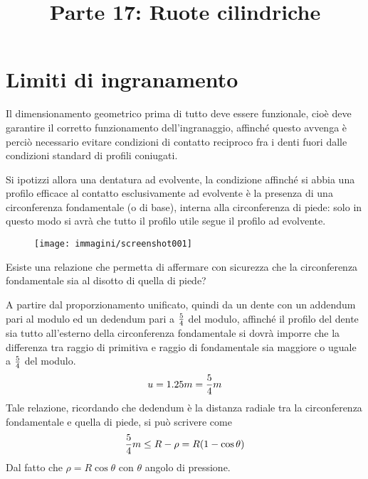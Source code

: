 \documentclass[a4paper, 15pt]{article}
\title{Parte 17: Ruote cilindriche}
\date{}
\begin{document}
		
		\maketitle
		\tableofcontents 
		\newpage
		
		\section{Limiti di ingranamento}		
		\begin{adjustwidth}{2in}{} 
		Il dimensionamento geometrico prima di tutto deve essere funzionale, cioè deve garantire il corretto funzionamento dell'ingranaggio, affinché questo avvenga è perciò necessario evitare condizioni di contatto reciproco fra i denti fuori dalle condizioni standard di profili coniugati.
		
		Si ipotizzi allora una dentatura ad evolvente, la condizione affinché si abbia una profilo efficace al contatto esclusivamente ad evolvente è la presenza di una circonferenza fondamentale (o di base), interna alla circonferenza di piede: solo in questo modo si avrà che tutto il profilo utile segue il profilo ad evolvente. 
		\begin{figure}[H]
			\centering
			\texttt{[image: immagini/screenshot001]}
			\label{fig:screenshot001}
		\end{figure}
		Esiste una relazione che permetta di affermare con sicurezza che la circonferenza fondamentale sia al disotto di quella di piede?
		
		A partire dal proporzionamento unificato, quindi da un dente con un addendum pari al modulo ed un dedendum pari a ${5\over4}$ del modulo,  affinché il profilo del dente sia tutto all'esterno della circonferenza fondamentale si dovrà imporre che la differenza tra raggio di primitiva e raggio di fondamentale sia maggiore o uguale a ${5\over4}$ del modulo. 
		\[u = 1.25m = {5\over4}m\]
		Tale relazione, ricordando che dedendum è la distanza radiale tra la circonferenza fondamentale e quella di piede, si può scrivere come 
		\[{5\over4}m\leq R - \rho = R(1-\cos\theta)\]
		Dal fatto che $\rho=R\cos\theta$ con $\theta$ angolo di pressione. \newline 
		

\end{adjustwidth}
\end{document}
